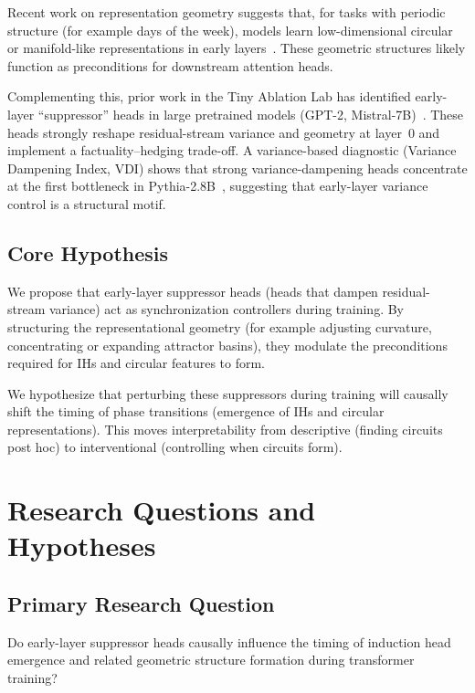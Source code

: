 \documentclass[11pt]{article}
\begin{document}
Recent work on representation geometry suggests that, for tasks with periodic structure (for example days of the week), models learn low-dimensional circular or manifold-like representations in early layers~\cite{aghajanyan2021better,simsek2021geometry}. These geometric structures likely function as preconditions for downstream attention heads.

Complementing this, prior work in the Tiny Ablation Lab has identified early-layer ``suppressor'' heads in large pretrained models (GPT-2, Mistral-7B)~\cite{thompson2025suppressors}. These heads strongly reshape residual-stream variance and geometry at layer~0 and implement a factuality--hedging trade-off. A variance-based diagnostic (Variance Dampening Index, VDI) shows that strong variance-dampening heads concentrate at the first bottleneck in Pythia-2.8B~\cite{biderman2023pythia}, suggesting that early-layer variance control is a structural motif.

\subsection{Core Hypothesis}

We propose that early-layer suppressor heads (heads that dampen residual-stream variance) act as synchronization controllers during training. By structuring the representational geometry (for example adjusting curvature, concentrating or expanding attractor basins), they modulate the preconditions required for IHs and circular features to form.

We hypothesize that perturbing these suppressors during training will causally shift the timing of phase transitions (emergence of IHs and circular representations). This moves interpretability from descriptive (finding circuits post hoc) to interventional (controlling when circuits form).

\section{Research Questions and Hypotheses}

\subsection{Primary Research Question}

Do early-layer suppressor heads causally influence the timing of induction head emergence and related geometric structure formation during transformer training?
\end{document}
